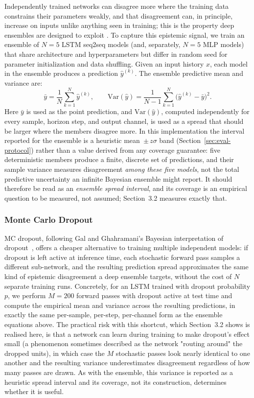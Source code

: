 \documentclass[a4paper,fleqn]{cas-sc}
\begin{document}
Independently trained networks can disagree more where the training data constrains their parameters weakly, and that disagreement can, in principle, increase on inputs unlike anything seen in training; this is the property deep ensembles are designed to exploit \cite{lakshminarayanan2017}. To capture this epistemic signal, we train an ensemble of $N=5$ LSTM seq2seq models (and, separately, $N=5$ MLP models) that share architecture and hyperparameters but differ in random seed for parameter initialization and data shuffling. Given an input history $x$, each model in the ensemble produces a prediction $\hat{y}^{(k)}$. The ensemble predictive mean and variance are:
\[
\bar{y} = \frac{1}{N} \sum_{k=1}^{N} \hat{y}^{(k)}, \qquad
\mathrm{Var}(\hat{y}) = \frac{1}{N-1} \sum_{k=1}^{N} \bigl(\hat{y}^{(k)} - \bar{y}\bigr)^2.
\]
Here $\bar y$ is used as the point prediction, and $\mathrm{Var}(\hat y)$, computed independently for every sample, horizon step, and output channel, is used as a spread that should be larger where the members disagree more. In this implementation the interval reported for the ensemble is a heuristic mean~$\pm\,z\sigma$ band (Section~\ref{sec:eval-protocol}) rather than a value derived from any coverage guarantee: five deterministic members produce a finite, discrete set of predictions, and their sample variance measures disagreement \emph{among these five models}, not the total predictive uncertainty an infinite Bayesian ensemble might report. It should therefore be read as an \emph{ensemble spread interval}, and its coverage is an empirical question to be measured, not assumed; Section~3.2 measures exactly that.

\subsubsection{Monte Carlo Dropout}

MC dropout, following Gal and Ghahramani's Bayesian interpretation of dropout~\cite{gal2016dropout, srivastava2014dropout}, offers a cheaper alternative to training multiple independent models: if dropout is left active at inference time, each stochastic forward pass samples a different sub-network, and the resulting prediction spread approximates the same kind of epistemic disagreement a deep ensemble targets, without the cost of $N$ separate training runs. Concretely, for an LSTM trained with dropout probability $p$, we perform $M=200$ forward passes with dropout active at test time and compute the empirical mean and variance across the resulting predictions, in exactly the same per-sample, per-step, per-channel form as the ensemble equations above. The practical risk with this shortcut, which Section~3.2 shows is realised here, is that a network can learn during training to make dropout's effect small (a phenomenon sometimes described as the network "routing around" the dropped units), in which case the $M$ stochastic passes look nearly identical to one another and the resulting variance underestimates disagreement regardless of how many passes are drawn. As with the ensemble, this variance is reported as a heuristic spread interval and its coverage, not its construction, determines whether it is useful.
\end{document}
